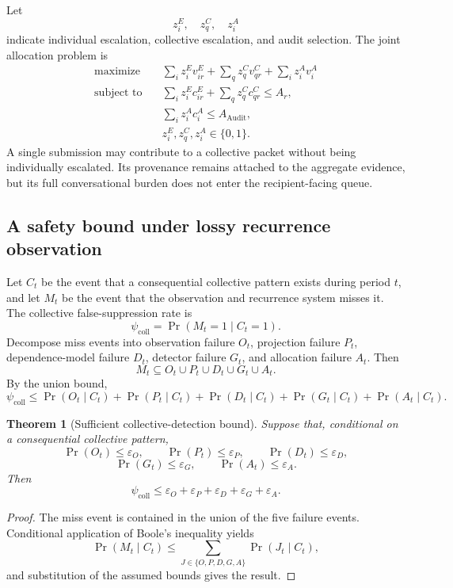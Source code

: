 \documentclass[11pt]{article}
\newtheorem{theorem}[definition]{Theorem}
\theoremstyle{definition}
\DeclareMathOperator{\Audit}{Audit}
\DeclareMathOperator{\Prob}{Pr}
\newcommand{\eps}{\varepsilon}
\begin{document}
Let
\[
z_i^{E},
\quad
z_q^{C},
\quad
z_i^{A}
\]
indicate individual escalation, collective escalation, and audit selection. The joint allocation problem is
\[
\begin{aligned}
\text{maximize}\quad&
\sum_i z_i^{E}v_{ir}^{E}
+
\sum_q z_q^{C}v_{qr}^{C}
+
\sum_i z_i^{A}v_i^{A}
\\
\text{subject to}\quad&
\sum_i z_i^{E}c_{ir}^{E}
+
\sum_q z_q^{C}c_{qr}^{C}
\leq A_r,
\\
&
\sum_i z_i^{A}c_i^{A}
\leq A_{\Audit},
\\
&
z_i^{E},z_q^{C},z_i^{A}\in\{0,1\}.
\end{aligned}
\]
A single submission may contribute to a collective packet without being individually escalated. Its provenance remains attached to the aggregate evidence, but its full conversational burden does not enter the recipient-facing queue.

\subsection{A safety bound under lossy recurrence observation}

Let \(C_t\) be the event that a consequential collective pattern exists during period \(t\), and let \(M_t\) be the event that the observation and recurrence system misses it. The collective false-suppression rate is
\[
\psi_{\mathrm{coll}}
=
\Prob(M_t=1\mid C_t=1).
\]
Decompose miss events into observation failure \(O_t\), projection failure \(P_t\), dependence-model failure \(D_t\), detector failure \(G_t\), and allocation failure \(A_t\). Then
\[
M_t
\subseteq
O_t\cup P_t\cup D_t\cup G_t\cup A_t.
\]
By the union bound,
\[
\psi_{\mathrm{coll}}
\leq
\Prob(O_t\mid C_t)
+
\Prob(P_t\mid C_t)
+
\Prob(D_t\mid C_t)
+
\Prob(G_t\mid C_t)
+
\Prob(A_t\mid C_t).
\]

\begin{theorem}[Sufficient collective-detection bound]
Suppose that, conditional on a consequential collective pattern,
\[
\Prob(O_t)\leq\eps_O,
\qquad
\Prob(P_t)\leq\eps_P,
\qquad
\Prob(D_t)\leq\eps_D,
\]
\[
\Prob(G_t)\leq\eps_G,
\qquad
\Prob(A_t)\leq\eps_A.
\]
Then
\[
\psi_{\mathrm{coll}}
\leq
\eps_O+\eps_P+\eps_D+\eps_G+\eps_A.
\]
\end{theorem}

\begin{proof}
The miss event is contained in the union of the five failure events. Conditional application of Boole's inequality yields
\[
\Prob(M_t\mid C_t)
\leq
\sum_{J\in\{O,P,D,G,A\}}
\Prob(J_t\mid C_t),
\]
and substitution of the assumed bounds gives the result.
\end{proof}
\end{document}
